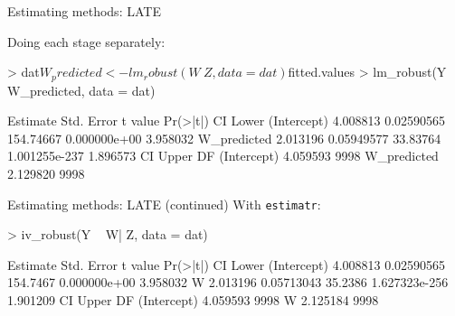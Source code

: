\documentclass[xcolor={dvipsnames},handout]{beamer}
\begin{document}

\begin{frame}[fragile]{Estimating methods: LATE}


Doing each stage separately:
\footnotesize
\begin{Schunk}
\begin{Sinput}
> dat$W_predicted <- lm_robust(W ~Z, data = dat)$fitted.values
> lm_robust(Y ~ W_predicted, data = dat)
\end{Sinput}
\begin{Soutput}
            Estimate Std. Error   t value      Pr(>|t|) CI Lower
(Intercept) 4.008813 0.02590565 154.74667  0.000000e+00 3.958032
W_predicted 2.013196 0.05949577  33.83764 1.001255e-237 1.896573
            CI Upper   DF
(Intercept) 4.059593 9998
W_predicted 2.129820 9998
\end{Soutput}
\end{Schunk}

\end{frame}

\begin{frame}[fragile]{Estimating methods: LATE (continued)}
With \texttt{estimatr}:
\begin{Schunk}
\begin{Sinput}
> iv_robust(Y ~ W| Z, data = dat)
\end{Sinput}
\begin{Soutput}
            Estimate Std. Error  t value      Pr(>|t|) CI Lower
(Intercept) 4.008813 0.02590565 154.7467  0.000000e+00 3.958032
W           2.013196 0.05713043  35.2386 1.627323e-256 1.901209
            CI Upper   DF
(Intercept) 4.059593 9998
W           2.125184 9998
\end{Soutput}
\end{Schunk}


\end{frame}


\end{document}
